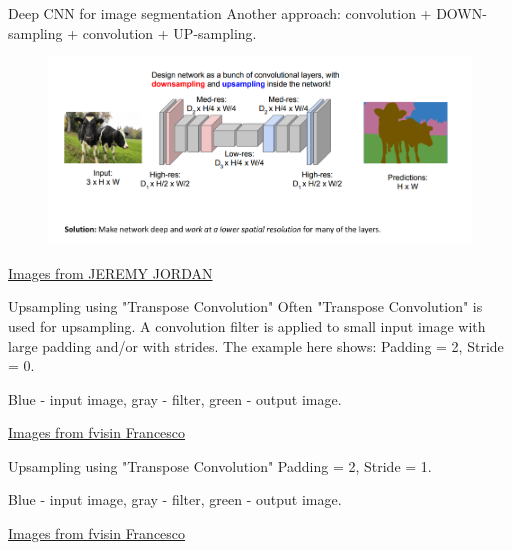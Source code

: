 \documentclass[handout]{beamer}
\begin{document}
\begin{frame}{Deep CNN for image segmentation}
    Another approach: convolution + DOWN-sampling + convolution + UP-sampling.
    \begin{figure}
   \centering
    \includegraphics[width=.9\textwidth]{fig/L2/Screen-Shot-2018-05-16-at-10.33.29-PM.png}
\end{figure}
{\tiny \href{https://www.jeremyjordan.me/semantic-segmentation/}{ Images from JEREMY JORDAN}}
\end{frame}

\begin{frame}{Upsampling using "Transpose Convolution"}
Often "Transpose Convolution" is used for upsampling. A convolution filter is applied to small input image with large padding and/or with strides. The example here shows: Padding = 2, Stride = 0.

Blue - input image, gray - filter, green - output image.
    \begin{figure}
        \centering
{}
    \end{figure}
{\tiny \href{https://github.com/vdumoulin/conv_arithmetic}{ Images from fvisin Francesco}}
\end{frame}

\begin{frame}{Upsampling using "Transpose Convolution"}
Padding = 2, Stride = 1.

Blue - input image, gray - filter, green - output image.
    \begin{figure}
        \centering
{}
    \end{figure}
{\tiny \href{https://github.com/vdumoulin/conv_arithmetic}{ Images from fvisin Francesco}}
\end{frame}
\end{document}
